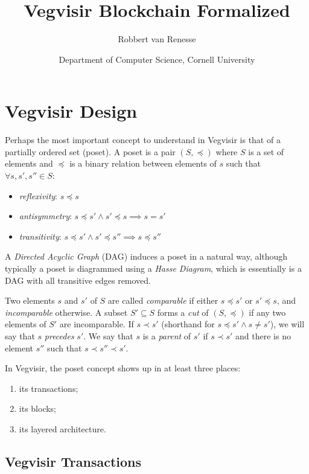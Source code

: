 \documentclass{article}
\title{Vegvisir Blockchain Formalized}
\author{Robbert van Renesse}
\date{Department of Computer Science, Cornell University}
\begin{document}
\maketitle

\section{Vegvisir Design}

Perhaps the most important concept to understand in Vegvisir is that of a partially ordered set (poset).
A poset is a pair $(S, \preceq)$ where $S$ is a set of elements and $\preceq$
is a binary relation between elements of $s$ such that
$\forall s, s', s'' \in S$:
\begin{itemize}
\item \emph{reflexivity}: $s \preceq s$
\item \emph{antisymmetry}: $s \preceq s' \wedge s' \preceq s \implies s = s'$
\item \emph{transitivity}: $s \preceq s' \wedge s' \preceq s'' \implies s \preceq s''$
\end{itemize}

A \emph{Directed Acyclic Graph} (DAG) induces a poset in a natural way,
although typically a poset is diagrammed using a \emph{Hasse Diagram},
which is essentially is a DAG with all transitive edges removed.

Two elements $s$ and $s'$ of $S$ are called \emph{comparable} if either
$s \preceq s'$ or $s' \preceq s$, and \emph{incomparable} otherwise.
A subset $S' \subseteq S$ forms a \emph{cut} of $(S, \preceq)$ if
any two elements of $S'$ are incomparable.
If $s \prec s'$ (shorthand for $s \preceq s' \wedge s \neq s'$),
we will say that $s$ \emph{precedes} $s'$.
We say that $s$ is a \emph{parent} of $s'$ if $s \prec s'$ and
there is no element $s''$ such that $s \prec s'' \prec s'$.

In Vegvisir, the poset concept shows up in at least three places:
\begin{enumerate}
\item its transactions;
\item its blocks;
\item its layered architecture.
\end{enumerate}

\subsection{Vegvisir Transactions}
\end{document}
